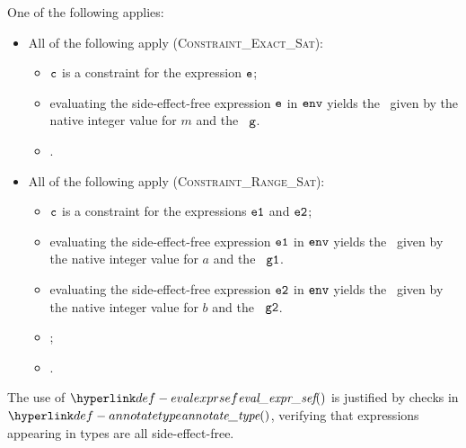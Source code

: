 \ProseParagraph
One of the following applies:
\begin{itemize}
  \item All of the following apply (\textsc{Constraint\_Exact\_Sat}):
  \begin{itemize}
    \item $\vc$ is a constraint for the expression $\ve$;
    \item evaluating the side-effect-free expression $\ve$ in $\env$ yields the \concurrentnativevalue\ given
          by the native integer value for $m$ and the \executiongraph\ $\vg$\ProseOrError.
    \item {}.
  \end{itemize}

  \item All of the following apply (\textsc{Constraint\_Range\_Sat}):
  \begin{itemize}
    \item $\vc$ is a constraint for the expressions $\veone$ and $\vetwo$;
    \item evaluating the side-effect-free expression $\veone$ in $\env$ yields the \concurrentnativevalue\ given
          by the native integer value for $a$ and the \executiongraph\ $\vgone$\ProseOrError.
    \item evaluating the side-effect-free expression $\vetwo$ in $\env$ yields the \concurrentnativevalue\ given
          by the native integer value for $b$ and the \executiongraph\ $\vgtwo$\ProseOrError.
    \item {};
    \item {}.
  \end{itemize}
\end{itemize}

\FormallyParagraph
The use of $\evalexprsef$ is justified by checks in $\annotatetype$, verifying
that expressions appearing in types are all side-effect-free.

\begin{mathpar}
\end{mathpar}

\begin{mathpar}
\end{mathpar}

